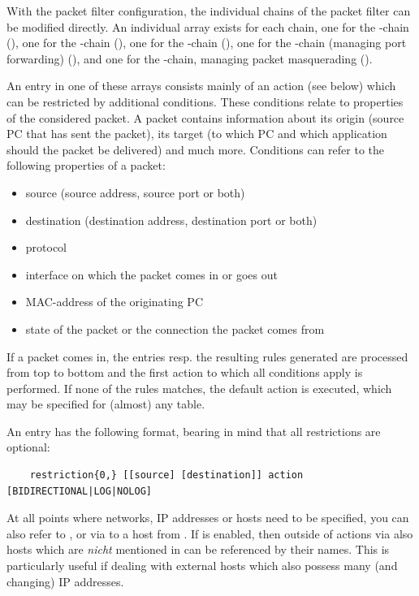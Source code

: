 With the packet filter configuration, the individual chains of the 
packet filter can be modified directly. An individual array exists
for each chain, one for the
-chain (), one for the
-chain (), one for the
-chain (), one for the
-chain (managing port forwarding)
(), and one for the -chain,
managing packet masquerading ().

An entry in one of these arrays consists mainly of an action (see below)
which can be restricted by additional conditions. These conditions
relate to properties of the considered packet. A packet contains
information about its origin (source PC that has sent the packet), 
its target (to which PC and which application should the packet be delivered)
and much more. Conditions can refer to the following properties of
a packet:

\begin{itemize}
  \item source (source address, source port or both)
  \item destination (destination address, destination port or both)
  \item protocol
  \item interface on which the packet comes in or goes out
  \item MAC-address of the originating PC
  \item state of the packet or the connection the packet comes from
\end{itemize}

If a packet comes in, the entries resp. the resulting rules generated
are processed from top to bottom and the first action to which all conditions
apply is performed. If none of the rules matches, the default action is executed,
which may be specified for (almost) any table.

An entry has the following format, bearing in mind that
all restrictions are optional:

\begin{example}
\begin{verbatim}
    restriction{0,} [[source] [destination]] action [BIDIRECTIONAL|LOG|NOLOG]
\end{verbatim}
\end{example}


At all points where networks, IP addresses or hosts need to be specified,
you can also refer to ,  or
via  to a host from . If 
is enabled, then outside of actions via  also hosts which
are \emph{nicht} mentioned in  can be referenced by their
names. This is particularly useful if dealing with external hosts which
also possess many (and changing) IP addresses.

